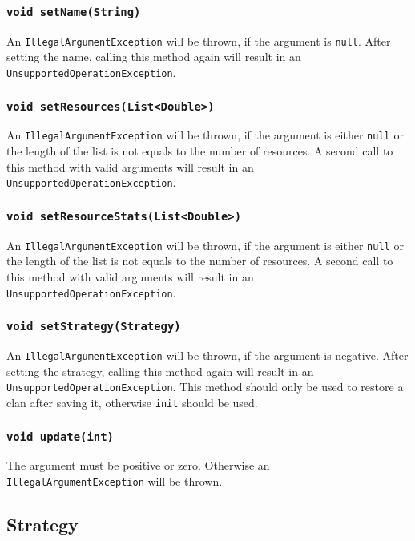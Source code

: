 \documentclass{article}
\begin{document}
\subsubsection{\texttt{void setName(String)}}
An \texttt{IllegalArgumentException} will be thrown, if the argument is \texttt{null}.
After setting the name, calling this method again will result in an \texttt{UnsupportedOperationException}.

\subsubsection{\texttt{void setResources(List<Double>)}}
An \texttt{IllegalArgumentException} will be thrown, if the argument is either \texttt{null}
or the length of the list is not equals to the number of resources.
A second call to this method with valid arguments will result in an \texttt{UnsupportedOperationException}.

\subsubsection{\texttt{void setResourceStats(List<Double>)}}
An \texttt{IllegalArgumentException} will be thrown, if the argument is either \texttt{null}
or the length of the list is not equals to the number of resources.
A second call to this method with valid arguments will result in an \texttt{UnsupportedOperationException}.

\subsubsection{\texttt{void setStrategy(Strategy)}}
An \texttt{IllegalArgumentException} will be thrown, if the argument is negative.
After setting the strategy, calling this method again will result in an \texttt{UnsupportedOperationException}.
This method should only be used to restore a clan after saving it, otherwise \texttt{init} should be used.

\subsubsection{\texttt{void update(int)}}
The argument must be positive or zero. Otherwise an \texttt{IllegalArgumentException} will be thrown.



\subsection{Strategy}
\end{document}
